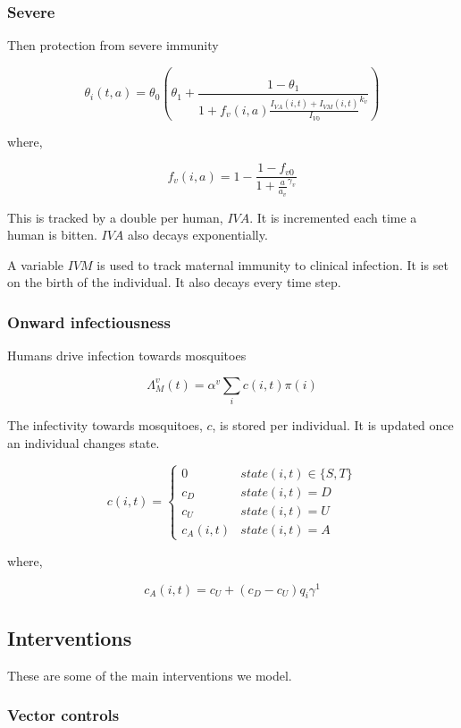 \documentclass{bmcart}
\begin{document}
\subsubsection*{Severe}

Then protection from severe immunity %

\[
\theta_i(t, a) = \theta_0 \left( \theta_1 + \frac{1 - \theta_1}{1 + f_v(i, a)\frac{I_{VA}(i, t) + I_{VM}(i, t)}{I_{V0}}^{k_v}} \right)
\]

where,

\[
f_v(i, a) = 1 - \frac{1 - f_{v0}}{1 + \frac{a}{a_v}^{\gamma_v}}
\]

This is tracked by a double per human, $IVA$. It is incremented each time a human is bitten. $IVA$ also decays exponentially.

A variable $IVM$ is used to track maternal immunity to clinical infection. It is set on the birth of the individual. It also decays every time step.

\subsubsection*{Onward infectiousness}

Humans drive infection towards mosquitoes

\[
\Lambda^v_M(t) = \alpha^v \sum_i c(i, t) \pi(i)
\]

The infectivity towards mosquitoes, $c$, is stored per individual. It is updated once an individual changes state.

\[
c(i, t) =
\begin{cases} 
  0  & state(i, t) \in \{S, T\} \\
  c_D & state(i, t) = D \\
  c_U & state(i, t) = U \\
  c_A(i, t) & state(i, t) = A
\end{cases}
\]

where,

\[  c_A(i, t) = c_U + (c_D - c_U) q_i \gamma^1 \]

\subsection*{Interventions}

These are some of the main interventions we model.

\subsubsection*{Vector controls}
\end{document}
